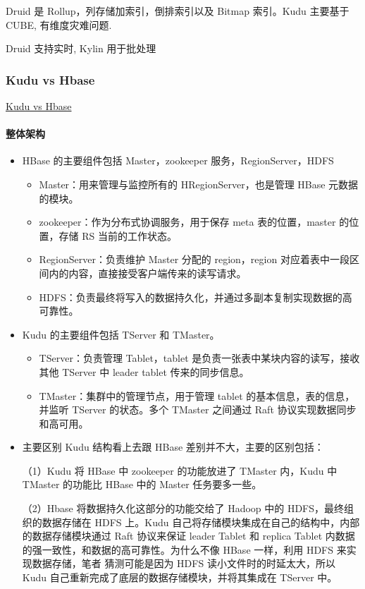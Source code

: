 \documentclass[hyperref, UTF-8]{ctexart}
\begin{document}
Druid 是 Rollup，列存储加索引，倒排索引以及 Bitmap 索引。Kudu 主要基于 CUBE, 有维度灾难问题.

Druid 支持实时, Kylin 用于批处理
\subsubsection{Kudu vs Hbase}
\label{sec:org96d0517}
\href{https://bigdata.163.com/product/article/15}{Kudu vs Hbase}

\paragraph{整体架构}
\label{sec:orga8c4088}
\begin{itemize}
\item HBase 的主要组件包括 Master，zookeeper 服务，RegionServer，HDFS
\begin{itemize}
\item Master：用来管理与监控所有的 HRegionServer，也是管理 HBase 元数据的模块。
\item zookeeper：作为分布式协调服务，用于保存 meta 表的位置，master 的位置，存储 RS 当前的工作状态。
\item RegionServer：负责维护 Master 分配的 region，region 对应着表中一段区间内的内容，直接接受客户端传来的读写请求。
\item HDFS：负责最终将写入的数据持久化，并通过多副本复制实现数据的高可靠性。
\end{itemize}
\item Kudu 的主要组件包括 TServer 和 TMaster。
\begin{itemize}
\item TServer：负责管理 Tablet，tablet 是负责一张表中某块内容的读写，接收其他 TServer 中 leader tablet 传来的同步信息。
\item TMaster：集群中的管理节点，用于管理 tablet 的基本信息，表的信息，并监听 TServer 的状态。多个 TMaster 之间通过 Raft 协议实现数据同步和高可用。
\end{itemize}
\item 主要区别
Kudu 结构看上去跟 HBase 差别并不大，主要的区别包括：

（1）Kudu 将 HBase 中 zookeeper 的功能放进了 TMaster 内，Kudu 中 TMaster 的功能比 HBase 中的 Master 任务要多一些。

（2）Hbase 将数据持久化这部分的功能交给了 Hadoop 中的 HDFS，最终组织的数据存储在 HDFS 上。Kudu 自己将存储模块集成在自己的结构中，内部的数据存储模块通过 Raft 协议来保证 leader Tablet 和 replica Tablet 内数据的强一致性，和数据的高可靠性。为什么不像 HBase 一样，利用 HDFS 来实现数据存储，笔者
猜测可能是因为 HDFS 读小文件时的时延太大，所以 Kudu 自己重新完成了底层的数据存储模块，并将其集成在 TServer 中。
\end{itemize}
\end{document}
